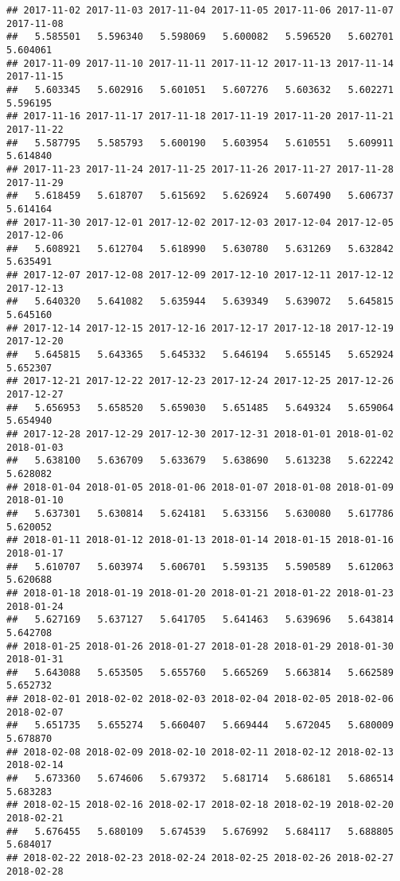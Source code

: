\documentclass[
]{article}
\begin{document}
\begin{verbatim}
## 2017-11-02 2017-11-03 2017-11-04 2017-11-05 2017-11-06 2017-11-07 2017-11-08 
##   5.585501   5.596340   5.598069   5.600082   5.596520   5.602701   5.604061 
## 2017-11-09 2017-11-10 2017-11-11 2017-11-12 2017-11-13 2017-11-14 2017-11-15 
##   5.603345   5.602916   5.601051   5.607276   5.603632   5.602271   5.596195 
## 2017-11-16 2017-11-17 2017-11-18 2017-11-19 2017-11-20 2017-11-21 2017-11-22 
##   5.587795   5.585793   5.600190   5.603954   5.610551   5.609911   5.614840 
## 2017-11-23 2017-11-24 2017-11-25 2017-11-26 2017-11-27 2017-11-28 2017-11-29 
##   5.618459   5.618707   5.615692   5.626924   5.607490   5.606737   5.614164 
## 2017-11-30 2017-12-01 2017-12-02 2017-12-03 2017-12-04 2017-12-05 2017-12-06 
##   5.608921   5.612704   5.618990   5.630780   5.631269   5.632842   5.635491 
## 2017-12-07 2017-12-08 2017-12-09 2017-12-10 2017-12-11 2017-12-12 2017-12-13 
##   5.640320   5.641082   5.635944   5.639349   5.639072   5.645815   5.645160 
## 2017-12-14 2017-12-15 2017-12-16 2017-12-17 2017-12-18 2017-12-19 2017-12-20 
##   5.645815   5.643365   5.645332   5.646194   5.655145   5.652924   5.652307 
## 2017-12-21 2017-12-22 2017-12-23 2017-12-24 2017-12-25 2017-12-26 2017-12-27 
##   5.656953   5.658520   5.659030   5.651485   5.649324   5.659064   5.654940 
## 2017-12-28 2017-12-29 2017-12-30 2017-12-31 2018-01-01 2018-01-02 2018-01-03 
##   5.638100   5.636709   5.633679   5.638690   5.613238   5.622242   5.628082 
## 2018-01-04 2018-01-05 2018-01-06 2018-01-07 2018-01-08 2018-01-09 2018-01-10 
##   5.637301   5.630814   5.624181   5.633156   5.630080   5.617786   5.620052 
## 2018-01-11 2018-01-12 2018-01-13 2018-01-14 2018-01-15 2018-01-16 2018-01-17 
##   5.610707   5.603974   5.606701   5.593135   5.590589   5.612063   5.620688 
## 2018-01-18 2018-01-19 2018-01-20 2018-01-21 2018-01-22 2018-01-23 2018-01-24 
##   5.627169   5.637127   5.641705   5.641463   5.639696   5.643814   5.642708 
## 2018-01-25 2018-01-26 2018-01-27 2018-01-28 2018-01-29 2018-01-30 2018-01-31 
##   5.643088   5.653505   5.655760   5.665269   5.663814   5.662589   5.652732 
## 2018-02-01 2018-02-02 2018-02-03 2018-02-04 2018-02-05 2018-02-06 2018-02-07 
##   5.651735   5.655274   5.660407   5.669444   5.672045   5.680009   5.678870 
## 2018-02-08 2018-02-09 2018-02-10 2018-02-11 2018-02-12 2018-02-13 2018-02-14 
##   5.673360   5.674606   5.679372   5.681714   5.686181   5.686514   5.683283 
## 2018-02-15 2018-02-16 2018-02-17 2018-02-18 2018-02-19 2018-02-20 2018-02-21 
##   5.676455   5.680109   5.674539   5.676992   5.684117   5.688805   5.684017 
## 2018-02-22 2018-02-23 2018-02-24 2018-02-25 2018-02-26 2018-02-27 2018-02-28 

\end{verbatim}
\end{document}

